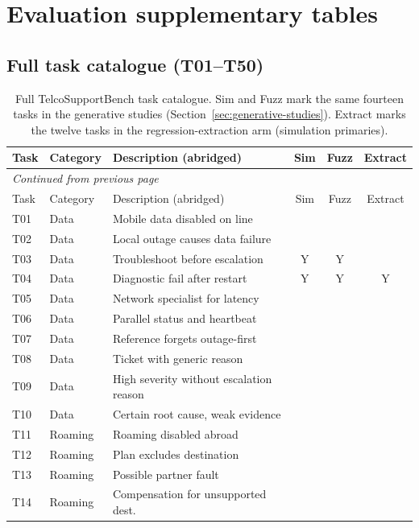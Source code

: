 \appendix
\chapter{Evaluation supplementary tables}
\label{app:evaluation}

\section{Full task catalogue (T01--T50)}
\label{app:full-task-catalog}

\begin{longtable}{@{}llp{4.8cm}ccc@{}}
\caption{Full TelcoSupportBench task catalogue. Sim and Fuzz mark the same fourteen tasks in the generative studies (Section~\ref{sec:generative-studies}). Extract marks the twelve tasks in the regression-extraction arm (simulation primaries).} \\
\toprule
Task & Category & Description (abridged) & Sim & Fuzz & Extract \\
\midrule
\endfirsthead
\multicolumn{6}{l}{\textit{Continued from previous page}} \\
\toprule
Task & Category & Description (abridged) & Sim & Fuzz & Extract \\
\midrule
\endhead
\bottomrule
\endfoot
T01 & Data & Mobile data disabled on line &  &  &  \\
T02 & Data & Local outage causes data failure &  &  &  \\
T03 & Data & Troubleshoot before escalation & Y & Y &  \\
T04 & Data & Diagnostic fail after restart & Y & Y & Y \\
T05 & Data & Network specialist for latency &  &  &  \\
T06 & Data & Parallel status and heartbeat &  &  &  \\
T07 & Data & Reference forgets outage-first &  &  &  \\
T08 & Data & Ticket with generic reason &  &  &  \\
T09 & Data & High severity without escalation reason &  &  &  \\
T10 & Data & Certain root cause, weak evidence &  &  &  \\
T11 & Roaming & Roaming disabled abroad &  &  &  \\
T12 & Roaming & Plan excludes destination &  &  &  \\
T13 & Roaming & Possible partner fault &  &  &  \\
T14 & Roaming & Compensation for unsupported dest. &  &  &  \\

\end{longtable}
